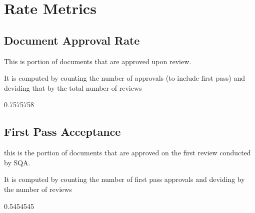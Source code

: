 \documentclass{article}
\begin{document}
\section{Rate Metrics}
\subsection{Document Approval Rate}
This is portion of documents that are approved upon review.

It is computed by counting the number of approvals (to include first pass)
and deviding that by the total number of reviews

\begin{Schunk}
\begin{Soutput}
[1] 0.7575758
\end{Soutput}
\end{Schunk}

\subsection{First Pass Acceptance}
this is the portion of documents that are approved on the first review conducted
by SQA.

It is computed by counting the number of first pass approvals and deviding by
the number of reviews

\begin{Schunk}
\begin{Soutput}
[1] 0.5454545
\end{Soutput}
\end{Schunk}
\end{document}
